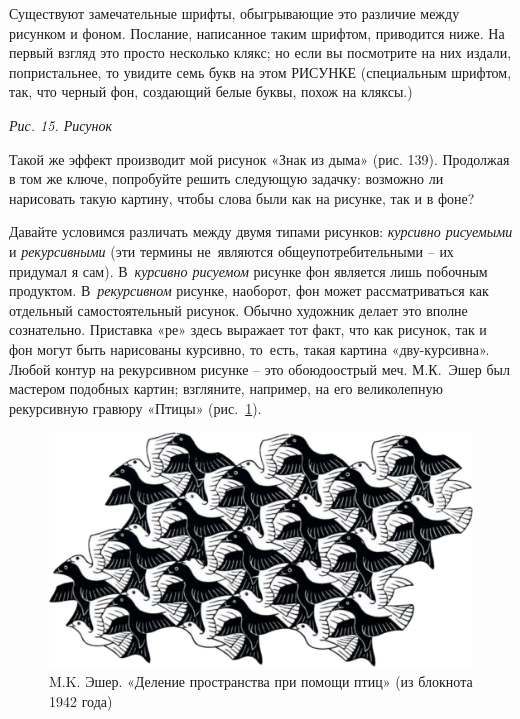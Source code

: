 \documentclass[../main.tex]{subfiles}
\begin{document}
Существуют замечательные шрифты, обыгрывающие это различие между рисунком и фоном.
Послание, написанное таким шрифтом, приводится ниже.
На первый взгляд это просто несколько клякс; но если вы посмотрите на них издали, попристальнее, то увидите семь букв на этом РИСУНКЕ (специальным шрифтом, так, что черный фон, создающий белые буквы, похож на кляксы.)

\emph{Рис. 15. Рисунок}

Такой же эффект производит мой рисунок «Знак из дыма» (рис. 139).
Продолжая в том же ключе, попробуйте решить следующую задачку: возможно ли нарисовать такую картину, чтобы слова были как на рисунке, так и в фоне?

Давайте условимся различать между двумя типами рисунков: \emph{курсивно рисуемыми} и \emph{рекурсивными} (эти термины не~являются общеупотребительными \--- их придумал я сам).
В~\emph{курсивно рисуемом} рисунке фон является лишь побочным продуктом.
В~\emph{рекурсивном} рисунке, наоборот, фон может рассматриваться как отдельный самостоятельный рисунок. Обычно художник делает это вполне сознательно.
Приставка «ре» здесь выражает тот факт, что как рисунок, так и фон могут быть нарисованы курсивно, то~есть, такая картина «дву-курсивна».
Любой контур на рекурсивном рисунке \--- это обоюдоострый меч.
М.К.~Эшер был мастером подобных картин; взгляните, например, на его великолепную рекурсивную гравюру «Птицы» (рис.~\ref{fig:escher-birds}).

\begin{figure}
    \centering
    \includegraphics[max width=\linewidth, max totalheight=\textheight-2\baselineskip]{img/escher-birds.png}
    \caption{M.K. Эшер. «Деление пространства при помощи птиц» (из блокнота 1942 года)}
    \label{fig:escher-birds}
\end{figure}
\end{document}
